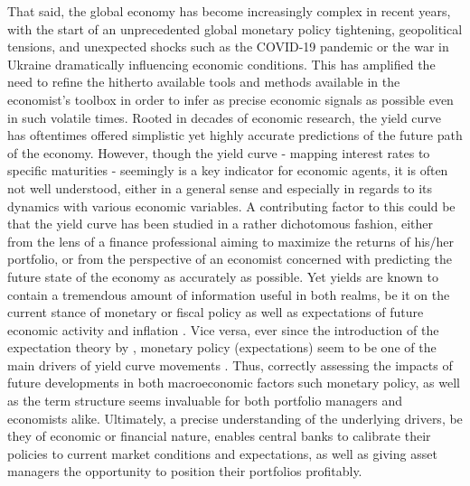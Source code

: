 That said, the global economy has become increasingly complex in recent years, with the start of an unprecedented global monetary policy tightening, geopolitical tensions, and unexpected shocks such as the COVID-19 pandemic or the war in Ukraine dramatically influencing economic conditions. 
This has amplified the need to refine the hitherto available tools and methods available in the economist's toolbox in order to infer as precise economic signals as possible even in such volatile times.
Rooted in decades of economic research, the yield curve has oftentimes offered simplistic yet highly accurate predictions of the future path of the economy. 
However, though the yield curve - mapping interest rates to specific maturities - seemingly is a key indicator for economic agents, it is often not well understood, either in a general sense and especially in regards to its dynamics with various economic variables.
A contributing factor to this could be that the yield curve has been studied in a rather dichotomous fashion, either from the lens of a finance professional aiming to maximize the returns of his/her portfolio, or from the perspective of an economist concerned with predicting the future state of the economy as accurately as possible. 
Yet yields are known to contain a tremendous amount of information useful in both realms, be it on the current stance of monetary or fiscal policy as well as expectations of future economic activity and inflation \citep{evans2007economic}. Vice versa, ever since the introduction of the expectation theory by \citet{hicks1946value},
monetary policy (expectations) seem to be one of the main drivers of yield curve movements \citep{evans1998monetary}. Thus, correctly assessing the impacts of future developments in both macroeconomic factors such monetary policy, as well as the term structure seems invaluable for both portfolio managers and economists alike.
Ultimately, a precise understanding of the underlying drivers, be they of economic or financial nature, enables central banks to calibrate their policies to current market conditions and expectations, as well as giving asset managers the opportunity to position their portfolios profitably. 
